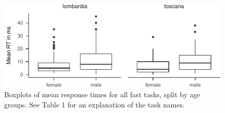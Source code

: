 \documentclass[
  english,
  man,floatsintext]{apa7}
\begin{document}
\begin{appendix}
\begin{figure}
\centering
\includegraphics{self_compassion_files/figure-latex/unnamed-chunk-23-1.pdf}
\caption{\label{fig:unnamed-chunk-23}Boxplots of mean response times for all
fast tasks, split by age groups. See Table 1 for an explanation of the
task names.}
\end{figure}
\end{appendix}
\end{document}
